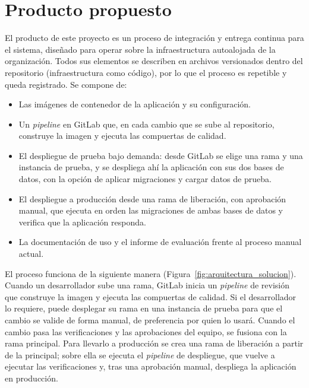 \section{Producto propuesto}
El producto de este proyecto es un proceso de integración y entrega continua para el sistema, diseñado para operar sobre la infraestructura autoalojada de la organización. Todos sus elementos se describen en archivos versionados dentro del repositorio (infraestructura como código), por lo que el proceso es repetible y queda registrado. Se compone de:
\begin{itemize}
  \item Las imágenes de contenedor de la aplicación y su configuración.
  \item Un \emph{pipeline} en GitLab que, en cada cambio que se sube al repositorio, construye la imagen y ejecuta las compuertas de calidad.
  \item El despliegue de prueba bajo demanda: desde GitLab se elige una rama y una instancia de prueba, y se despliega ahí la aplicación con sus dos bases de datos, con la opción de aplicar migraciones y cargar datos de prueba.
  \item El despliegue a producción desde una rama de liberación, con aprobación manual, que ejecuta en orden las migraciones de ambas bases de datos y verifica que la aplicación responda.
  \item La documentación de uso y el informe de evaluación frente al proceso manual actual.
\end{itemize}

El proceso funciona de la siguiente manera (Figura~\ref{fig:arquitectura_solucion}).
Cuando un desarrollador sube una rama, GitLab inicia un \emph{pipeline} de revisión que
construye la imagen y ejecuta las compuertas de calidad. Si el desarrollador lo requiere,
puede desplegar su rama en una instancia de prueba para que el cambio se valide de forma
manual, de preferencia por quien lo usará. Cuando el cambio pasa las verificaciones y las
aprobaciones del equipo, se fusiona con la rama principal. Para llevarlo a producción se
crea una rama de liberación a partir de la principal; sobre ella se ejecuta el \emph{pipeline}
de despliegue, que vuelve a ejecutar las verificaciones y, tras una aprobación manual, despliega
la aplicación en producción.

